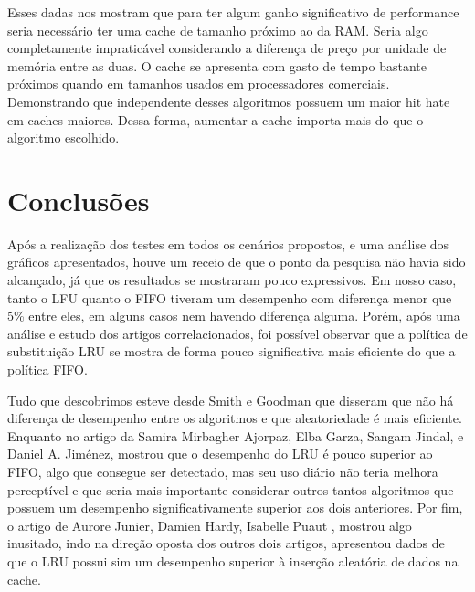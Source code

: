 \documentclass[conference]{IEEEtran}
\begin{document}
Esses dadas nos mostram que para ter algum ganho significativo de performance seria necessário ter uma cache de tamanho próximo ao da RAM. 
Seria algo completamente impraticável considerando a diferença de preço por unidade de memória entre as duas. O cache se apresenta com 
gasto de tempo bastante próximos quando em tamanhos usados em processadores comerciais. Demonstrando que independente desses algoritmos 
possuem um maior hit hate em caches maiores. Dessa forma, aumentar a cache importa mais do que o algoritmo escolhido.


\section{Conclusões}


Após a realização dos testes em todos os cenários propostos, e uma análise dos gráficos apresentados, houve um 
receio de que o ponto da pesquisa não havia sido alcançado, já que os resultados se mostraram pouco expressivos. 
Em nosso caso, tanto o LFU quanto o FIFO tiveram um desempenho com diferença menor que 5\% entre eles, em alguns 
casos nem havendo diferença alguma. Porém, após uma análise e estudo dos artigos correlacionados, foi possível observar que 
a política de substituição LRU se mostra de forma pouco significativa mais eficiente do que a política FIFO. 

Tudo que descobrimos esteve desde Smith e Goodman \cite{b1} que disseram que não há diferença de desempenho entre os algoritmos 
e que aleatoriedade é mais eficiente. Enquanto no artigo da Samira Mirbagher Ajorpaz, Elba Garza, Sangam Jindal, e Daniel A. Jiménez\cite{b3}, 
mostrou que o desempenho do LRU é pouco superior ao FIFO, algo que consegue ser detectado, mas seu uso diário não teria melhora perceptível e 
que seria mais importante considerar outros tantos algoritmos que possuem um desempenho significativamente superior aos dois anteriores. Por fim, 
o artigo de Aurore Junier, Damien Hardy, Isabelle Puaut \cite{b2}, mostrou algo inusitado, indo na direção oposta dos outros dois artigos, 
apresentou dados de que o LRU possui sim um desempenho superior à inserção aleatória de dados na cache.
\end{document}
